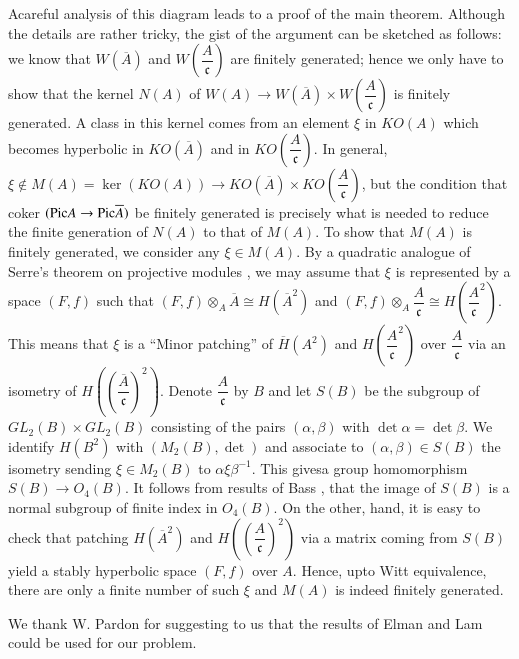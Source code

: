 A\pageoriginale careful analysis of this diagram leads to a proof of the main theorem. Although the details are rather tricky, the gist of the argument can be sketched as follows: we know that $W\left(\overline{A}\right)$ and $W\left(\dfrac{A}{\mathfrak{c}}\right)$ are finitely generated; hence we only have to show that the kernel $N(A)$ of $W(A)\to W\left(\overline{A}\right)\times W\left(\dfrac{A}{\mathfrak{c}}\right)$ is finitely generated. A class in this kernel comes from an element $\xi$ in $KO(A)$ which becomes hyperbolic in $KO\left(\overline{A}\right)$ and in $KO\left(\dfrac{A}{\mathfrak{c}}\right)$. In general, $\xi \not\in M(A)=\ker (KO(A))\to KO\left(\overline{A}\right)\times KO\left(\dfrac{A}{\mathfrak{c}}\right)$, but the condition that coker $(\mathrm{Pic} A\to \mathrm{Pic} \overline{A})$ be finitely generated is precisely what is needed to reduce the finite generation of $N(A)$ to that of $M(A)$. To show that $M(A)$ is finitely generated, we consider any  $\xi \in M(A)$. By a quadratic analogue of Serre's theorem on projective modules \cite{key13}, we may assume that $\xi$ is represented by a space $(F,f)$ such that $(F,f)\otimes_A\overline{A}\cong H\left(\overline{A}^{2}\right)$ and $(F,f) \otimes_A \dfrac{A}{\mathfrak{c}}\cong H\left(\dfrac{A}{\mathfrak{c}}^{2}\right)$. This means that $\xi$ is a ``Minor patching'' of $\overline{H}(A^{2})$ and $H\left(\dfrac{A}{\mathfrak{c}}^{2}\right)$ over $\dfrac{A}{\mathfrak{c}}$ via an isometry of $H\left(\left(\dfrac{\overline{A}}{\mathfrak{c}}\right)^{2}\right)$. Denote $\dfrac{A}{\mathfrak{c}}$ by $B$ and let $S(B)$ be the subgroup of $GL_2(B)\times GL_2(B)$ consisting of the pairs $(\alpha, \beta)$ with $\det \alpha=\det \beta$. We identify $H(B^{2})$ with $(M_2(B),\det)$ and associate to $(\alpha, \beta)\in S(B)$ the isometry sending $\xi \in M_2(B)$ to $\alpha\xi \beta^{-1}$. This gives\pageoriginale a group homomorphism $S(B)\to O_4(B)$. It follows from results of Bass \cite{key2}, that the image of $S(B)$ is a normal subgroup of finite index in $O_4(B)$. On the other, hand, it is easy to check that patching $H\left(\overline{A}^{2}\right)$ and $H\left(\left(\dfrac{A}{\mathfrak{c}}\right)^{2}\right)$ via a matrix coming from $S(B)$ yield a stably hyperbolic space  $(F,f)$ over $A$. Hence, upto Witt equivalence, there are only a finite number of such $\xi$ and $M(A)$ is indeed finitely generated.

\begin{ack}
We thank W. Pardon for suggesting to us that the results of Elman and Lam could be used for our problem.
\end{ack}


